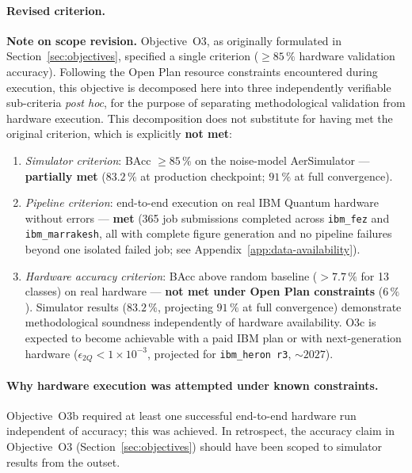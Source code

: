 \documentclass[11pt,a4paper, english]{book}
\theoremstyle{plain}
\theoremstyle{definition}
\numberwithin{equation}{chapter}
\numberwithin{figure}{chapter}
\numberwithin{table}{chapter}
\begin{document}
\paragraph{Revised criterion.}
\noindent\textbf{Note on scope revision.} Objective~O3, as originally
formulated in Section~\ref{sec:objectives}, specified a single
criterion ($\geq 85\,\%$ hardware validation accuracy). Following the
Open Plan resource constraints encountered during execution, this
objective is decomposed here into three independently verifiable
sub-criteria \emph{post hoc}, for the purpose of separating
methodological validation from hardware execution. This decomposition
does not substitute for having met the original criterion, which is
explicitly \textbf{not met}:
 
\begin{enumerate}[label=(O3\alph*), leftmargin=5em]
  \item \emph{Simulator criterion}: BAcc $\geq85\,\%$ on the
        noise-model AerSimulator --- \textbf{partially met}
        ($83.2\,\%$ at production checkpoint; $91\,\%$ at full
        convergence).
 
  \item \emph{Pipeline criterion}: end-to-end execution on real
      IBM Quantum hardware without errors ---
      \textbf{met} (365 job submissions completed across
      \texttt{ibm\_fez} and \texttt{ibm\_marrakesh}, all with
      complete figure generation and no pipeline failures
      beyond one isolated failed job; see
      Appendix~\ref{app:data-availability}).
 
  \item \emph{Hardware accuracy criterion}: BAcc above random
        baseline ($>7.7\,\%$ for 13 classes) on real hardware ---
        \textbf{not met under Open Plan constraints} ($6\,\%$).
        Simulator results ($83.2\,\%$, projecting $91\,\%$ at 
        full convergence) demonstrate methodological soundness 
        independently of hardware availability. 
        O3c is expected to become achievable with a paid
        IBM plan or with next-generation hardware
        ($\epsilon_{2Q}<1\times10^{-3}$, projected for
        \texttt{ibm\_heron~r3}, ${\sim}2027$).
\end{enumerate}

\paragraph{Why hardware execution was attempted under known constraints.}
Objective~O3b required at least one successful end-to-end hardware run
independent of accuracy; this was achieved. In retrospect, the accuracy
claim in Objective~O3 (Section~\ref{sec:objectives}) should have been
scoped to simulator results from the outset.
\end{document}
